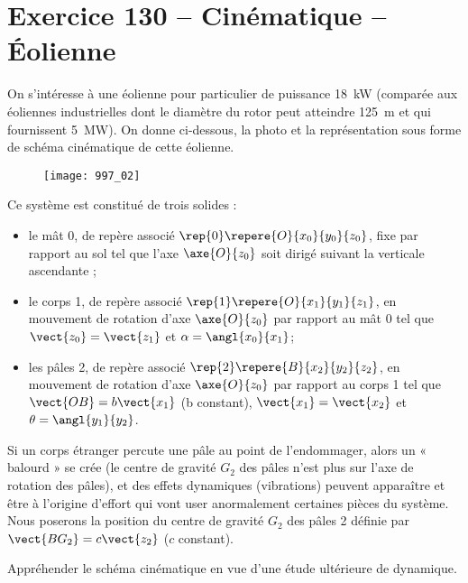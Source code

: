 \section*{Exercice 130 -- Cinématique -- Éolienne}
\setcounter{exo}{0}

On s'intéresse à une éolienne pour particulier de puissance \SI{18}{kW} (comparée aux éoliennes
industrielles dont le diamètre du rotor peut atteindre \SI{125}{m} et qui fournissent \SI{5}{MW}).
On donne ci-dessous, la photo et la représentation sous forme de schéma cinématique de cette éolienne.



\begin{figure}[H]
\centering
\texttt{[image: 997\_02]}
\end{figure}

Ce système est constitué de trois solides :
\begin{itemize}
\item le mât 0, de repère associé  $\rep{0}\repere{O}{x_0}{y_0}{z_0}$, fixe par rapport au sol tel que l’axe $\axe{O}{z_0}$  soit dirigé suivant la verticale ascendante ;
\item le corps 1, de repère associé   $\rep{1}\repere{O}{x_1}{y_1}{z_1}$, en mouvement de rotation d’axe $\axe{O}{z_0}$  par rapport au mât 0 tel que $\vect{z_0}=\vect{z_1}$ et $\alpha = \angl{x_0}{x_1}$;
\item les pâles 2, de repère associé $\rep{2}\repere{B}{x_2}{y_2}{z_2}$, en mouvement de rotation d’axe $\axe{O}{z_0}$ par rapport au corps 1 tel que $\vect{OB}=b\vect{x_1}$ (b constant), $\vect{x_1}=\vect{x_2}$ et $\theta = \angl{y_1}{y_2}$.
\end{itemize}
Si un corps étranger percute une pâle au point de l'endommager, alors un « balourd » se crée (le centre de gravité $G_2$ des
pâles n’est plus sur l’axe de rotation des pâles), et des effets dynamiques (vibrations) peuvent apparaître et être à l’origine
d’effort qui vont user anormalement certaines pièces du système.
Nous poserons la position du centre de gravité $G_2$ des pâles 2 définie par $\vect{BG_2}=c\vect{z_2}$ ($c$ constant).

 \begin{obj}
Appréhender le schéma cinématique en vue d’une étude ultérieure de dynamique.
 \end{obj}



